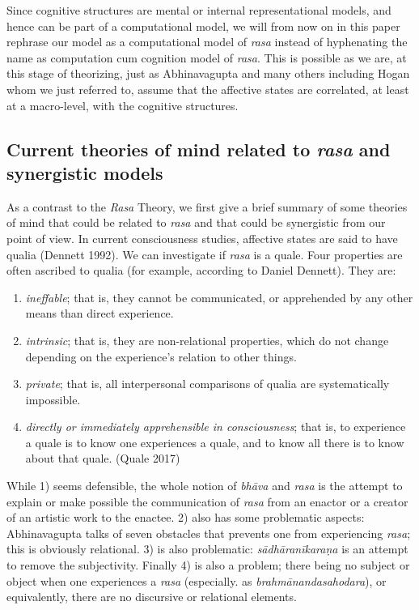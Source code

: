 Since cognitive structures are mental or internal representational models, and hence can be part of a computational model, we will from now on in this paper rephrase our model as a computational model of \textsl{rasa} instead of hyphenating the name as computation cum cognition model of \textsl{rasa}. This is possible as we are, at this stage of theorizing, just as Abhinavagupta and many others including Hogan whom we just referred to, assume that the affective states are correlated, at least at a macro-level, with the cognitive structures.

\subsection{Current theories of mind related to \textsl{rasa} and synergistic models}\label{chap3-sec3.1}

As a contrast to the \textsl{Rasa} Theory, we first give a brief summary of some theories of mind that could be related to \textsl{rasa} and that could be synergistic from our point of view. In current consciousness studies, affective states are said to have qualia (Dennett 1992). We can investigate if \textsl{rasa} is a quale. Four properties are often ascribed to qualia (for example, according to Daniel Dennett). They are:
\begin{enumerate}
\item \textsl{ineffable}; that is, they cannot be communicated, or apprehended by any other means than direct experience.
\item \textsl{intrinsic}; that is, they are non-relational properties, which do not change depending on the experience's relation to other things.
\item \textsl{private}; that is, all interpersonal comparisons of qualia are systematically impossible.
\item  \textsl{directly or immediately apprehensible in consciousness}; that is, to experience a quale is to know one experiences a quale, and to know all there is to know about that quale. (Quale 2017)
\end{enumerate}

While 1) seems defensible, the whole notion of \textsl{bhāva} and \textsl{rasa} is the attempt to explain or make possible the communication of \textsl{rasa} from an enactor or a creator of an artistic work to the enactee. 2) also has some problematic aspects: Abhinavagupta talks of seven obstacles that prevents one from experiencing \textsl{rasa}; this is obviously relational. 3) is also problematic: \textsl{sādhāranīkaraṇa} is an attempt to remove the subjectivity. Finally 4) is also a problem; there being no subject or object when one experiences a \textsl{rasa} (especially. as \textsl{brahmānandasahodara}), or equivalently, there are no discursive or relational elements.

